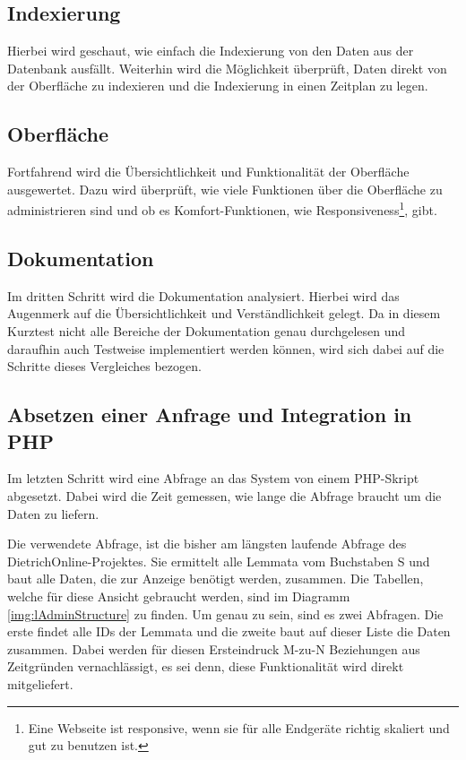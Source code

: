 \subsection{Indexierung}

Hierbei wird geschaut, wie einfach die Indexierung von den Daten aus der Datenbank ausfällt. Weiterhin wird die Möglichkeit überprüft, Daten direkt von der Oberfläche zu indexieren und die Indexierung in einen Zeitplan zu legen.

\subsection{Oberfläche}

Fortfahrend wird die Übersichtlichkeit und Funktionalität der Oberfläche ausgewertet. Dazu wird überprüft, wie viele Funktionen über die Oberfläche zu administrieren sind und ob es Komfort-Funktionen, wie Responsiveness\footnote{Eine Webseite ist responsive, wenn sie für alle Endgeräte richtig skaliert und gut zu benutzen ist.}, gibt.

\subsection{Dokumentation}

Im dritten Schritt wird die Dokumentation analysiert. Hierbei wird das Augenmerk auf die Übersichtlichkeit und Verständlichkeit gelegt. Da in diesem Kurztest nicht alle Bereiche der Dokumentation genau durchgelesen und daraufhin auch Testweise implementiert werden können, wird sich dabei auf die Schritte dieses Vergleiches bezogen.

\subsection{Absetzen einer Anfrage und Integration in PHP}

Im letzten Schritt wird eine Abfrage an das System von einem PHP-Skript abgesetzt. Dabei wird die Zeit gemessen, wie lange die Abfrage braucht um die Daten zu liefern.

Die verwendete Abfrage, ist die bisher am längsten laufende Abfrage des DietrichOnline-Projektes. Sie ermittelt alle Lemmata vom Buchstaben S und baut alle Daten, die zur Anzeige benötigt werden, zusammen. Die Tabellen, welche für diese Ansicht gebraucht werden, sind im Diagramm \ref{img:lAdminStructure} zu finden. Um genau zu sein, sind es zwei Abfragen. Die erste findet alle IDs der Lemmata und die zweite baut auf dieser Liste die Daten zusammen. Dabei werden für diesen Ersteindruck M-zu-N Beziehungen aus Zeitgründen vernachlässigt, es sei denn, diese Funktionalität wird direkt mitgeliefert.

